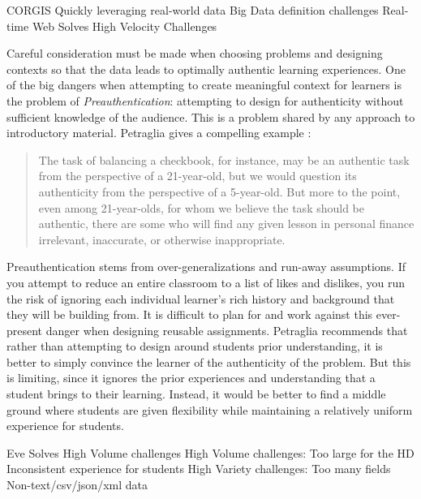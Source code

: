 CORGIS
Quickly leveraging real-world data
Big Data 
	definition
	challenges
Real-time Web
Solves High Velocity Challenges



Careful consideration must be made when choosing problems and designing contexts so that the data leads to optimally authentic learning experiences.
	One of the big dangers when attempting to create meaningful context for learners is the problem of \textit{Preauthentication}: attempting to design for authenticity without sufficient knowledge of the audience. This is a problem shared by any approach to introductory material. Petraglia gives a compelling example \cite{preauthentication}:
	
\begin{quotation}
    The task of balancing a checkbook, for instance, may be an authentic task from the perspective of a 21-year-old, but we would question its authenticity from the perspective of a 5-year-old. But more to the point, even among 21-year-olds, for whom we believe the task should be authentic, there are some who will find any given lesson in personal finance irrelevant, inaccurate, or otherwise inappropriate. 
\end{quotation}
Preauthentication stems from over-generalizations and run-away assumptions.
If you attempt to reduce an entire classroom to a list of likes and dislikes, you run the risk of ignoring each individual learner's rich history and background that they will be building from. 
It is difficult to plan for and work against this ever-present danger when designing reusable assignments. 
Petraglia \cite{preauthentication} recommends that rather than attempting to design around students prior understanding, it is better to simply convince the learner of the authenticity of the problem.
But this is limiting, since it ignores the prior experiences and understanding that a student brings to their learning.
Instead, it would be better to find a middle ground where students are given flexibility while maintaining a relatively uniform experience for students.

Eve
Solves High Volume challenges
High Volume challenges:
Too large for the HD
Inconsistent experience for students
High Variety challenges:
Too many fields
Non-text/csv/json/xml data
